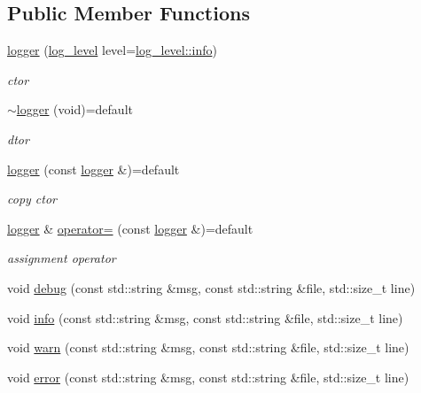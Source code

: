 \subsection*{Public Member Functions}
\begin{DoxyCompactItemize}
\item 
\hyperlink{classcpp__redis_1_1logger_a36b15a75690a087fca7d304852785512}{logger} (\hyperlink{classcpp__redis_1_1logger_a9493594d547e7abe71b8690be1946c7a}{log\+\_\+level} level=\hyperlink{classcpp__redis_1_1logger_a9493594d547e7abe71b8690be1946c7aacaf9b6b99962bf5c2264824231d7a40c}{log\+\_\+level\+::info})
\begin{DoxyCompactList}\small\item\em ctor \end{DoxyCompactList}\item 
\hyperlink{classcpp__redis_1_1logger_ab5eb02b26c96a6e5cba9a7d30669f625}{$\sim$logger} (void)=default
\begin{DoxyCompactList}\small\item\em dtor \end{DoxyCompactList}\item 
\hyperlink{classcpp__redis_1_1logger_aec0854d47a13f91e09db25e745a3d722}{logger} (const \hyperlink{classcpp__redis_1_1logger}{logger} \&)=default
\begin{DoxyCompactList}\small\item\em copy ctor \end{DoxyCompactList}\item 
\hyperlink{classcpp__redis_1_1logger}{logger} \& \hyperlink{classcpp__redis_1_1logger_a09d012d32f35421a16ec73143adc4415}{operator=} (const \hyperlink{classcpp__redis_1_1logger}{logger} \&)=default
\begin{DoxyCompactList}\small\item\em assignment operator \end{DoxyCompactList}\item 
void \hyperlink{classcpp__redis_1_1logger_a36e0908e7b05850b663a4b8b9cdbc299}{debug} (const std\+::string \&msg, const std\+::string \&file, std\+::size\+\_\+t line)
\item 
void \hyperlink{classcpp__redis_1_1logger_a04c741b5110946e76bb23728da6fb2ac}{info} (const std\+::string \&msg, const std\+::string \&file, std\+::size\+\_\+t line)
\item 
void \hyperlink{classcpp__redis_1_1logger_ae9359429428786c7b5605a1109508ae5}{warn} (const std\+::string \&msg, const std\+::string \&file, std\+::size\+\_\+t line)
\item 
void \hyperlink{classcpp__redis_1_1logger_aaf7f2837511f4414a4d7b7b923ebc15e}{error} (const std\+::string \&msg, const std\+::string \&file, std\+::size\+\_\+t line)
\end{DoxyCompactItemize}
